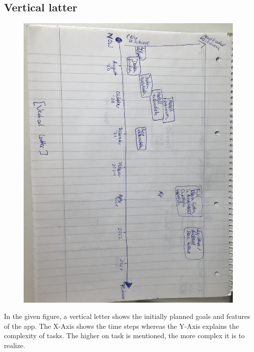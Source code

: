 \subsection{Vertical latter}

\begin{figure}[h]
\includegraphics[scale=0.55, natwidth=1024, natheight=200]{images/verticallatter.jpg}
\end{figure}


In the given figure, a vertical letter shows the initially planned goals and features of the app. The X-Axis shows the time steps whereas the Y-Axis explains the complexity of tasks. The higher on task is mentioned, the more complex it is to realize.

